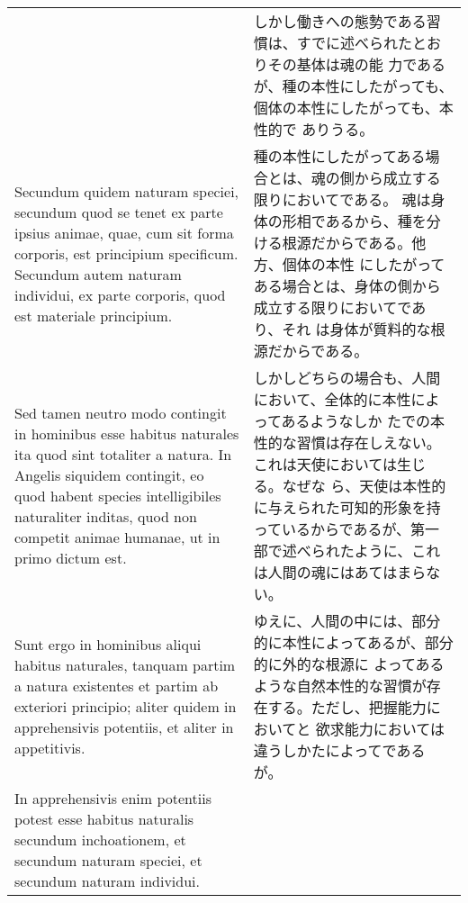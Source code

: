 \documentclass[10pt]{jsarticle} %
\begin{document}
\begin{longtable}{p{21em}p{21em}}
&

しかし働きへの態勢である習慣は、すでに述べられたとおりその基体は魂の能
力であるが、種の本性にしたがっても、個体の本性にしたがっても、本性的で
 ありうる。

\\



Secundum quidem naturam speciei, secundum quod se tenet ex parte
ipsius animae, quae, cum sit forma corporis, est principium
specificum. Secundum autem naturam individui, ex parte corporis, quod
est materiale principium.


&

種の本性にしたがってある場合とは、魂の側から成立する限りにおいてである。
魂は身体の形相であるから、種を分ける根源だからである。他方、個体の本性
にしたがってある場合とは、身体の側から成立する限りにおいてであり、それ
は身体が質料的な根源だからである。

\\




Sed tamen neutro modo contingit in hominibus esse habitus naturales
ita quod sint totaliter a natura. In Angelis siquidem contingit, eo
quod habent species intelligibiles naturaliter inditas, quod non
competit animae humanae, ut in primo dictum est.


&

しかしどちらの場合も、人間において、全体的に本性によってあるようなしか
 たでの本性的な習慣は存在しえない。これは天使においては生じる。なぜな
 ら、天使は本性的に与えられた可知的形象を持っているからであるが、第一
 部で述べられたように、これは人間の魂にはあてはまらない。

\\



Sunt ergo in hominibus aliqui habitus naturales, tanquam
 partim a natura existentes et partim ab exteriori principio; aliter
 quidem in apprehensivis potentiis, et aliter in appetitivis. 

&

ゆえに、人間の中には、部分的に本性によってあるが、部分的に外的な根源に
よってあるような自然本性的な習慣が存在する。ただし、把握能力においてと
欲求能力においては違うしかたによってであるが。

\\



In apprehensivis enim potentiis potest esse habitus naturalis secundum
inchoationem, et secundum naturam speciei, et secundum naturam
individui.



\end{longtable}
\end{document}
